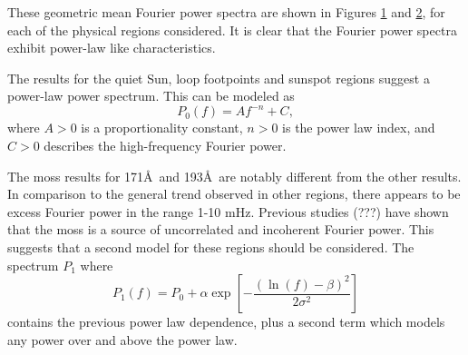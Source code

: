 \documentclass[manuscript]{../aastex52/aastex}
\begin{document}
These geometric mean Fourier power spectra are shown in Figures
\ref{fig:geom171} and \ref{fig:geom193}, for each of the physical
regions considered.  It is clear that the Fourier power spectra
exhibit power-law like characteristics.  

\begin{figure}
\label{fig:geom171}
\caption{}
\end{figure}

\begin{figure}
\label{fig:geom193}

\caption{}
\end{figure}

The results for the quiet Sun, loop footpoints and sunspot regions
suggest a power-law power spectrum.  This can be modeled as
\begin{equation}
\label{eq:pwrlaw}
P_{0}(f) = Af^{-n} + C,
\end{equation}
where $A>0$ is a proportionality constant, $n>0$ is the power law
index, and $C>0$ describes the high-frequency Fourier power.

The moss results for 171\AA\ and 193\AA\ are notably different from
the other results.  In comparison to the general trend observed in
other regions, there appears to be excess Fourier power in the range
1-10 mHz.  Previous studies (???) have shown that the moss is a source
of uncorrelated and incoherent Fourier power.  This suggests that a
second model for these regions should be considered.  The spectrum
$P_{1}$ where
\begin{equation}
\label{eq:pwrlawbump}
P_{1}(f) = P_{0} + \alpha\exp\left[-\frac{(\ln(f)-\beta)^{2}}{2\sigma^{2}}\right]
\end{equation}
contains the previous power law dependence, plus a second term which
models any power over and above the power law.
\end{document}
